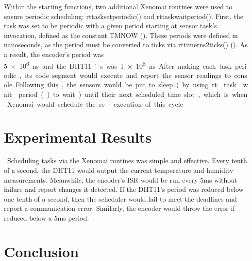 \documentclass[letterpaper, 12pt]{article}
\begin{document}
\indent Within the starting functions, two additional Xenomai routines were used to ensure periodic scheduling: rt\textunderscore task\textunderscore set\textunderscore periodic() and rt\textunderscore task\textunderscore wait\textunderscore period().  First, the task was set to be periodic with a given period starting at sensor task's invocation, defined as the constant TM\textunderscore NOW (\cite{xenomai2018}).  These periods were defined in nanoseconds, as the period must be converted to ticks via rt\textunderscore timer\textunderscore ns2ticks() (\cite{xenomai2018}).  As a result, the encoder's period was \SI{5e6} ns and the DHT11's was \SI{1e8} ns.  After making each task periodic, its code segment would execute and report the sensor readings to console.  Following this, the sensors would be put to sleep (by using rt\textunderscore task\textunderscore wait\textunderscore period() to wait) until their next scheduled time slot, which is when Xenomai would schedule the re-execution of this cycle.

~\newpage
\section{Experimental Results}
~\indent Scheduling tasks via the Xenomai routines was simple and effective.  Every tenth of a second, the DHT11 would output the current temperature and humidity measurements.  Meanwhile, the encoder's ISR would be run every 5ms without failure and report changes it detected.  If the DHT11's period was reduced below one tenth of a second, then the scheduler would fail to meet the deadlines and report a communication error.  Similarly, the encoder would throw the error if reduced below a 5ms period.  

\section{Conclusion}

~\newpage
\printbibliography
~\newpage
%
\end{document}
